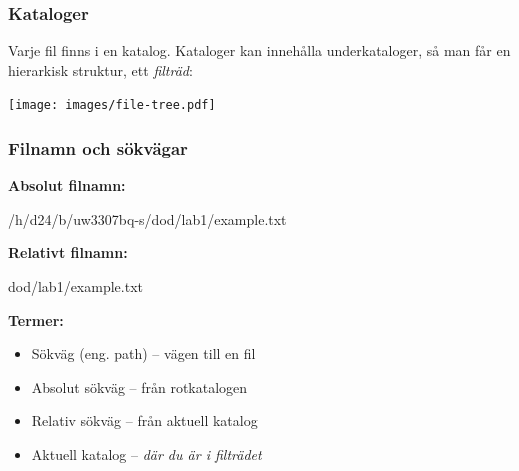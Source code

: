 \begin{frame}[fragile=singleslide]
    \frametitle{Kataloger}
    Varje fil finns i en katalog. Kataloger kan innehålla underkataloger, så man får en hierarkisk struktur, ett \emph{filträd}:

    \begin{center}
        \texttt{[image: images/file-tree.pdf]}
    \end{center}

\end{frame}








\begin{frame}[fragile=singleslide]
    \frametitle{Filnamn och sökvägar}

    \textbf{Absolut filnamn:}
    \begin{Code}
        /h/d24/b/uw3307bq-s/dod/lab1/example.txt
    \end{Code}

    \textbf{Relativt filnamn:}
    \begin{Code}
        dod/lab1/example.txt
    \end{Code}

    \textbf{Termer:}
    \begin{itemize}
        \item Sökväg (eng. path) -- vägen till en fil
        \item Absolut sökväg -- från rotkatalogen
        \item Relativ sökväg -- från aktuell katalog
        \item Aktuell katalog -- \emph{där du är i filträdet}
    \end{itemize}

\end{frame}


